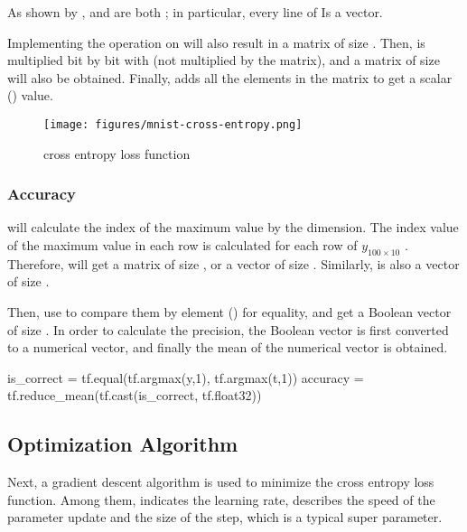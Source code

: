 \begin{content}
\begin{content}
As shown by ,  and  are both \code{[100, 10]}; in particular, every line of  Is a  vector.

Implementing the  operation on  will also result in a matrix of size \code{[100, 10]}. Then,  is multiplied bit by bit with  (not multiplied by the matrix), and a matrix of size \code{[100, 10]} will also be obtained. Finally,  adds all the elements in the matrix to get a scalar () value.

\begin{figure}[H]
  \centering
  \texttt{[image: figures/mnist-cross-entropy.png]}
  \caption{cross entropy loss function}
  \label{fig:mnist-cross-entropy}
\end{figure}


\subsubsection{Accuracy}
 will calculate the index of the maximum value by the  dimension. The index value of the maximum value in each row is calculated for each row of $ y_{100 \times 10} $ . Therefore,  will get a matrix of size \code{[100, 1]}, or a vector of size . Similarly,  is also a vector of size .

Then, use  to compare them by element () for equality, and get a Boolean vector of size . In order to calculate the precision, the Boolean vector is first converted to a numerical vector, and finally the mean of the numerical vector is obtained.

\begin{leftbar}
\begin{python}
is_correct = tf.equal(tf.argmax(y,1), tf.argmax(t,1))
accuracy = tf.reduce_mean(tf.cast(is_correct, tf.float32))
\end{python}
\end{leftbar}


\subsection{Optimization Algorithm}
Next, a gradient descent algorithm is used to minimize the cross entropy loss function. Among them,  indicates the learning rate, describes the speed of the parameter update and the size of the step, which is a typical super parameter.


\end{content}
\end{content}

